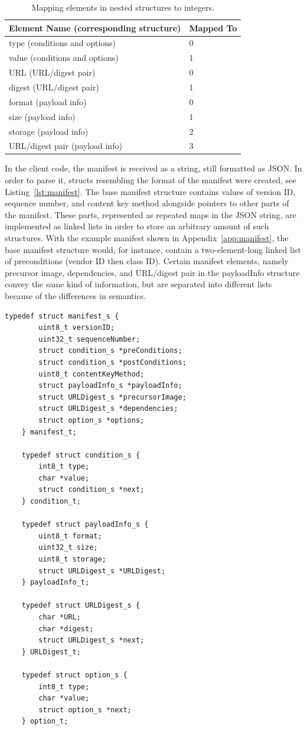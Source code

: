 \documentclass[0-thesis.tex]{subfiles}
\begin{document}
\begin{longtable}[]{@{}ll@{}}
    \caption{Mapping elements in nested structures to integers.}
    \label{tab:nested-substitution}\\
    \toprule
    Element Name (corresponding structure) & Mapped To\tabularnewline
    \midrule
    \endhead
    type (conditions and options) & 0\tabularnewline
    value (conditions and options) & 1\tabularnewline
    \bottomrule
    URL (URL/digest pair) & 0\tabularnewline
    digest (URL/digest pair) & 1\tabularnewline
    \bottomrule
    format (payload info) & 0\tabularnewline
    size (payload info) & 1\tabularnewline
    storage (payload info) & 2\tabularnewline
    URL/digest pair (payload info) & 3\tabularnewline
    \bottomrule
\end{longtable}

In the client code, the manifest is received as a string, still formatted as JSON. In
order to parse it, structs resembling the format of the manifest were created, see
Listing~\ref{lst:manifest}. The base manifest structure contains values of version ID,
sequence number, and content key method alongside pointers to other parts of the manifest.
These parts, represented as repeated maps in the JSON string, are implemented as linked
lists in order to store an arbitrary amount of such structures. With the example manifest
shown in Appendix~\ref{app:manifest}, the base manifest structure would, for instance,
contain a two-element-long linked list of preconditions (vendor ID then class ID). Certain
manifest elements, namely precursor image, dependencies, and URL/digest pair in the
payloadInfo structure convey the same kind of information, but are separated into different
lists because of the differences in semantics.

\begin{lstlisting}[language=manifest, caption={The client manifest implementation.}, label=lst:manifest]
    typedef struct manifest_s {
        uint8_t versionID;
        uint32_t sequenceNumber;
        struct condition_s *preConditions;
        struct condition_s *postConditions;
        uint8_t contentKeyMethod;
        struct payloadInfo_s *payloadInfo;
        struct URLDigest_s *precursorImage;
        struct URLDigest_s *dependencies;
        struct option_s *options;
    } manifest_t;

    typedef struct condition_s {
        int8_t type;
        char *value;
        struct condition_s *next;
    } condition_t;

    typedef struct payloadInfo_s {
        uint8_t format;
        uint32_t size;
        uint8_t storage;
        struct URLDigest_s *URLDigest;
    } payloadInfo_t;

    typedef struct URLDigest_s {
        char *URL;
        char *digest;
        struct URLDigest_s *next;
    } URLDigest_t;

    typedef struct option_s {
        int8_t type;
        char *value;
        struct option_s *next;
    } option_t;
\end{lstlisting}
\end{document}
